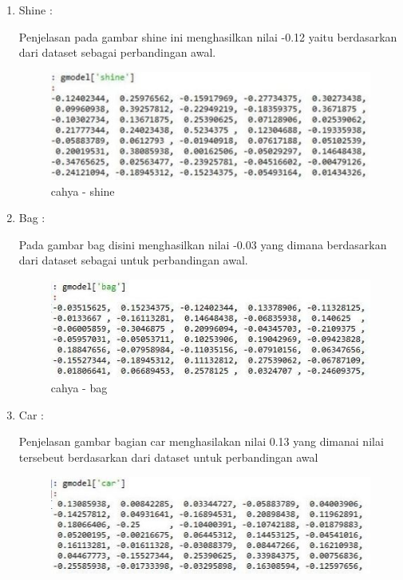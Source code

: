 \begin{enumerate}
\begin{enumerate}
\item Shine : 
\par Penjelasan pada gambar shine ini menghasilkan nilai -0.12 yaitu berdasarkan dari dataset sebagai perbandingan awal.
\par
\begin{figure}[!hbtp]
\centering
\includegraphics[scale=0.2]{figures/cahya-shine.jpg}
\caption{cahya - shine}
\label{ cahya - shine }
\end{figure}
\par
\item Bag :  
\par Pada gambar bag disini menghasilkan nilai -0.03 yang dimana berdasarkan dari dataset sebagai untuk perbandingan awal.
\par
\begin{figure}[!hbtp]
\centering
\includegraphics[scale=0.2]{figures/cahya-bag.jpg}
\caption{ cahya - bag}
\label{cahya - bag}
\end{figure}
\par
\item Car :  
\par Penjelasan gambar bagian car menghasilakan nilai 0.13  yang dimanai nilai tersebeut berdasarkan dari dataset untuk perbandingan awal 
\par
\begin{figure}[!hbtp]
\centering
\includegraphics[scale=0.2]{figures/cahya-car.jpg}

\end{figure}
\end{enumerate}
\end{enumerate}
